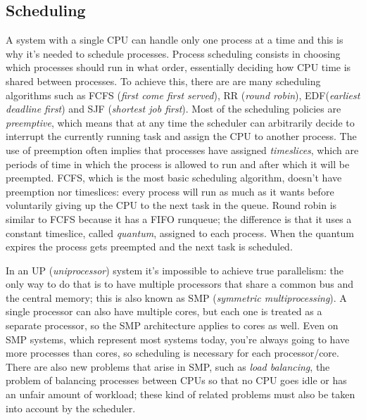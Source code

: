 \documentclass[10pt]{book}
\begin{document}
\subsection{Scheduling} A system with a single CPU can handle only one process at a time and this is why it's needed to schedule processes. Process scheduling consists in choosing which processes should run in what order, essentially deciding how CPU time is shared between processes. To achieve this, there are are many scheduling algorithms such as FCFS (\textit{first come first served}), RR (\textit{round robin}), EDF(\textit{earliest deadline first}) and SJF (\textit{shortest job first}). Most of the scheduling policies are \textit{preemptive}, which means that at any time the scheduler can arbitrarily decide to interrupt the currently running task and assign the CPU to another process. The use of preemption often implies that processes have assigned \textit{timeslices}, which are periods of time in which the process is allowed to run and after which it will be preempted. FCFS, which is the most basic scheduling algorithm, doesn't have preemption nor timeslices: every process will run as much as it wants before voluntarily giving up the CPU to the next task in the queue. Round robin is similar to FCFS because it has a FIFO runqueue; the difference is that it uses a constant timeslice, called \textit{quantum}, assigned to each process. When the quantum expires the process gets preempted and the next task is scheduled.

In an UP (\textit{uniprocessor}) system it's impossible to achieve true parallelism: the only way to do that is to have multiple processors that share a common bus and the central memory; this is also known as SMP (\textit{symmetric multiprocessing}). A single processor can also have multiple cores, but each one is treated as a separate processor, so the SMP architecture applies to cores as well. Even on SMP systems, which represent most systems today, you're always going to have more processes than cores, so scheduling is necessary for each processor/core. There are also new problems that arise in SMP, such as \textit{load balancing}, the problem of balancing processes between CPUs so that no CPU goes idle or has an unfair amount of workload; these kind of related problems must also be taken into account by the scheduler.
\end{document}
